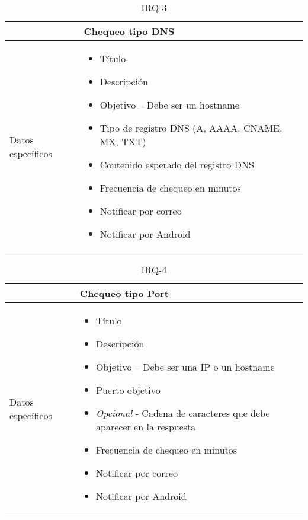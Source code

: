 \begin{table}[h!]
  \centering
  \begin{tabularx}{\textwidth}{|l|X|}
    \hline

    & Chequeo tipo DNS \\

    \hline
    Datos específicos &

    \begin{itemize}
      \item Título 
      \item Descripción
      \item Objetivo -- Debe ser un hostname
      \item Tipo de registro DNS (A, AAAA, CNAME, MX, TXT)
      \item Contenido esperado del registro DNS
      \item Frecuencia de chequeo en minutos
      \item Notificar por correo
      \item Notificar por Android
    \end{itemize}
    \\
    
    \hline
    
  \end{tabularx}
  \caption{IRQ-3}
\end{table}

\begin{table}[h!]
  \centering
  \begin{tabularx}{\textwidth}{|l|X|}
    \hline

    & Chequeo tipo Port \\

    \hline
    Datos específicos &

    \begin{itemize}
      \item Título 
      \item Descripción
      \item Objetivo -- Debe ser una IP o un hostname
      \item Puerto objetivo
      \item \textit{Opcional} - Cadena de caracteres que debe aparecer en la respuesta
      \item Frecuencia de chequeo en minutos
      \item Notificar por correo
      \item Notificar por Android
    \end{itemize}
    \\
    
    \hline
    
  \end{tabularx}
  \caption{IRQ-4}
\end{table}

